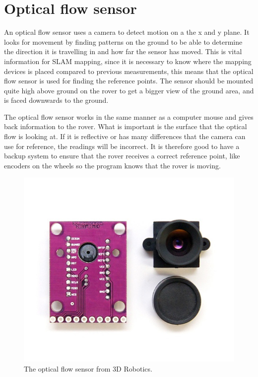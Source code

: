 \clearpage
\section{Optical flow sensor}

An optical flow sensor uses a camera to detect motion on a the x and y plane. It looks for movement by finding patterns on the ground to be able to determine the direction it is travelling in and how far the sensor has moved. This is vital information for SLAM mapping, since it is necessary to know where the mapping devices is placed compared to previous measurements, this means that the optical flow sensor is used for finding the reference points. The sensor should be mounted quite high above ground on the rover to get a bigger view of the ground area, and is faced downwards to the ground.

The optical flow sensor works in the same manner as a computer mouse and gives back information to the rover. What is important is the surface that the optical flow is looking at. If it is reflective or has many differences that the camera can use for reference, the readings will be incorrect. It is therefore good to have a backup system to ensure that the rover receives a correct reference point, like encoders on the wheels so the program knows that the rover is moving.


\begin{figure}[H]
	\centering
	\includegraphics[width=.3\linewidth]{images/optical.jpg}
	\caption{The optical flow sensor from 3D Robotics.}
\end{figure}

